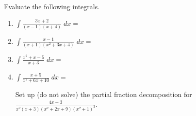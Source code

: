 \documentclass{exam}[12pt]
\begin{document}
\pagestyle{head}

\extraheadheight{.3in}
\extrafootheight{-.3in} 


\vspace{.2in}
\large{
Evaluate the following integrals.
\begin{enumerate}

\item $\displaystyle \int  \frac{3x+2}{(x-1)(x+4)}  \; dx = $
\vspace{3.5in}

\item $\displaystyle \int \frac{x-1}{(x+1)(x^2+3x+4)}\; dx =$
\vspace{4in}

\item $\displaystyle \int  \frac{x^2 + x -5}{x + 3}     \; dx = $
\vspace{3.2in}

\item $\displaystyle \int   \frac{x+5}{x^2+6x+10}    \; dx = $
\vspace{3.2in}



Set up (do not solve) the partial fraction decomposition for 
$\displaystyle \frac{4x -3 }{x^2(x+3)(x^2+2x+9)(x^2+1)^3}$.
\vspace{1.1in}


\end{enumerate}
}
\end{document}
